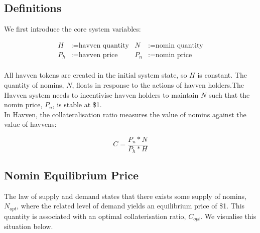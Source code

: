 \newpage

\subsection{Definitions}

\noindent We first introduce the core system variables:

\begin{align*}
H &:= \text{havven quantity} & N &:= \text{nomin quantity} \\
P_h &:= \text{havven price}  & P_n &:= \text{nomin price} \\
\end{align*}

\noindent All havven tokens are created in the initial system state, so $H$ is constant. The quantity of nomins, $N$, floats in response to the actions of havven holders.The Havven system needs to incentivise havven holders to maintain $N$ such that the nomin price, $P_n$, is stable at \$1.\\

\noindent In Havven, the collateralisation ratio measures the value of nomins against the value of havvens:

\begin{equation}
C = \frac{P_n * N}{P_h * H} \label{eq:1}
\end{equation}

\subsection{Nomin Equilibrium Price} The law of supply and demand states that there exists some supply of nomins, $N_{opt}$, where the related level of demand yields an equilibrium price of \$1. This quantity is associated with an optimal collaterisation ratio, $C_{opt}$. We visualise this situation below. \\

\begin{center}
\end{center}

